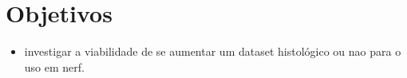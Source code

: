 \section{Objetivos}

\begin{itemize}
  \item investigar a viabilidade de se aumentar um dataset histológico ou nao para o uso em nerf.
\end{itemize}



%
%    
%
